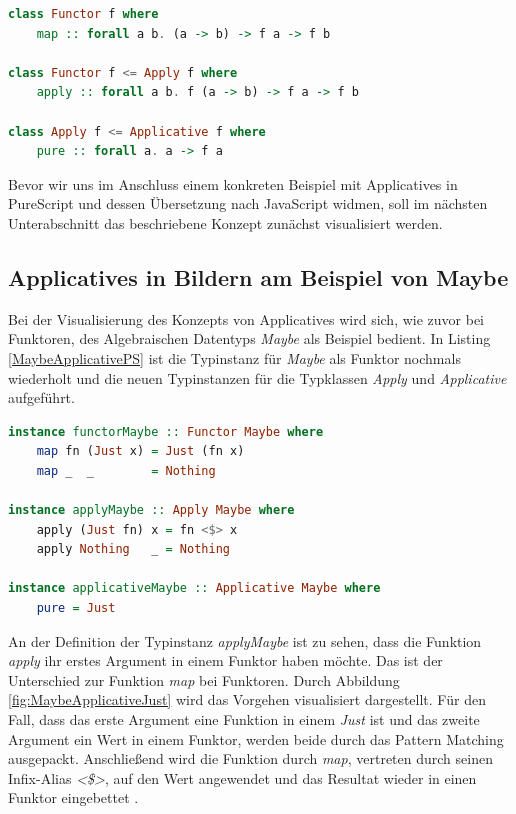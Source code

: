 \documentclass[
12pt,
ngerman,
oneside]
{scrbook} %
\begin{document}
\begin{lstlisting}[language=purescript, style=numbered-and-boxed, caption=Typklasse Applicative, label=ApplicativeTCPS]
class Functor f where
	map :: forall a b. (a -> b) -> f a -> f b

class Functor f <= Apply f where
	apply :: forall a b. f (a -> b) -> f a -> f b

class Apply f <= Applicative f where
	pure :: forall a. a -> f a
\end{lstlisting}

Bevor wir uns im Anschluss einem konkreten Beispiel mit Applicatives in PureScript und dessen Übersetzung nach JavaScript widmen, soll im nächsten Unterabschnitt das beschriebene Konzept zunächst visualisiert werden.

\subsection{Applicatives in Bildern am Beispiel von Maybe}
Bei der Visualisierung des Konzepts von Applicatives wird sich, wie zuvor bei Funktoren, des Algebraischen Datentyps \emph{Maybe} als Beispiel bedient. In Listing \ref{MaybeApplicativePS} ist die Typinstanz für \emph{Maybe} als Funktor nochmals wiederholt und die neuen Typinstanzen für die Typklassen \emph{Apply} und \emph{Applicative} aufgeführt.

\begin{lstlisting}[language=purescript, style=numbered-and-boxed, caption=Applicative-Intanz Maybe, label=MaybeApplicativePS]
instance functorMaybe :: Functor Maybe where
	map fn (Just x) = Just (fn x)
	map _  _        = Nothing

instance applyMaybe :: Apply Maybe where
	apply (Just fn) x = fn <$> x
	apply Nothing   _ = Nothing
	
instance applicativeMaybe :: Applicative Maybe where
	pure = Just
\end{lstlisting}

An der Definition der Typinstanz \emph{applyMaybe} ist zu sehen, dass die Funktion \emph{apply} ihr erstes Argument in einem Funktor haben möchte. Das ist der Unterschied zur Funktion \emph{map} bei Funktoren. Durch Abbildung \ref{fig:MaybeApplicativeJust} wird das Vorgehen visualisiert dargestellt. Für den Fall, dass das erste Argument eine Funktion in einem \emph{Just} ist und das zweite Argument ein Wert in einem Funktor, werden beide durch das Pattern Matching ausgepackt. Anschließend wird die Funktion durch \emph{map}, vertreten durch seinen Infix-Alias \emph{<\$>}, auf den Wert angewendet und das Resultat wieder in einen Funktor eingebettet \cite[][S. 84]{Freeman17}.
\end{document}
